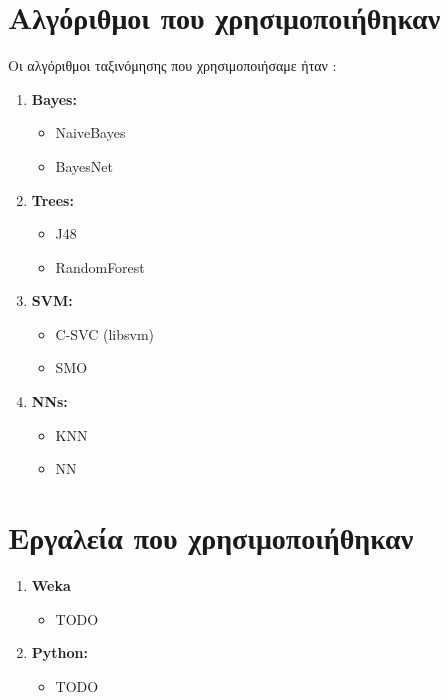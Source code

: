 \section{Αλγόριθμοι που χρησιμοποιήθηκαν}
Οι αλγόριθμοι ταξινόμησης που χρησιμοποιήσαμε ήταν :
\begin{enumerate}
  \item \textbf{Bayes:}
  \begin{itemize}
     \item NaiveBayes
     \item BayesNet
  \end{itemize}  
  \item \textbf{Trees:}
  \begin{itemize}
     \item J48
     \item RandomForest
  \end{itemize}
  \item \textbf{SVM:}  
  \begin{itemize}
     \item C-SVC (libsvm)
     \item SMO
  \end{itemize}
  \item \textbf{NNs:}
  \begin{itemize}
     \item KNN
     \item NN
  \end{itemize}
\end{enumerate}

\section{Εργαλεία που χρησιμοποιήθηκαν}

\begin{enumerate}
  \item \textbf{Weka}
  \begin{itemize}
     \item TODO
  \end{itemize}  
  \item \textbf{Python:}
\begin{itemize}
     \item TODO
\end{itemize}
\end{enumerate}